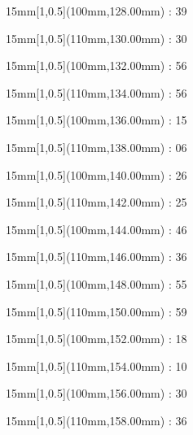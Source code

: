 \documentclass[a5paper]{memoir}
\begin{document}
\begin{textblock*}{15mm}[1,0.5](100mm,128.00mm) : 39\gridstrut\end{textblock*}
\begin{textblock*}{15mm}[1,0.5](110mm,130.00mm) : 30\gridstrut\end{textblock*}
\begin{textblock*}{15mm}[1,0.5](100mm,132.00mm) : 56\gridstrut\end{textblock*}
\begin{textblock*}{15mm}[1,0.5](110mm,134.00mm) : 56\gridstrut\end{textblock*}
\begin{textblock*}{15mm}[1,0.5](100mm,136.00mm) : 15\gridstrut\end{textblock*}
\begin{textblock*}{15mm}[1,0.5](110mm,138.00mm) : 06\gridstrut\end{textblock*}
\begin{textblock*}{15mm}[1,0.5](100mm,140.00mm) : 26\gridstrut\end{textblock*}
\begin{textblock*}{15mm}[1,0.5](110mm,142.00mm) : 25\gridstrut\end{textblock*}
\begin{textblock*}{15mm}[1,0.5](100mm,144.00mm) : 46\gridstrut\end{textblock*}
\begin{textblock*}{15mm}[1,0.5](110mm,146.00mm) : 36\gridstrut\end{textblock*}
\begin{textblock*}{15mm}[1,0.5](100mm,148.00mm) : 55\gridstrut\end{textblock*}
\begin{textblock*}{15mm}[1,0.5](110mm,150.00mm) : 59\gridstrut\end{textblock*}
\begin{textblock*}{15mm}[1,0.5](100mm,152.00mm) : 18\gridstrut\end{textblock*}
\begin{textblock*}{15mm}[1,0.5](110mm,154.00mm) : 10\gridstrut\end{textblock*}
\begin{textblock*}{15mm}[1,0.5](100mm,156.00mm) : 30\gridstrut\end{textblock*}
\begin{textblock*}{15mm}[1,0.5](110mm,158.00mm) : 36\gridstrut\end{textblock*}
\end{document}
